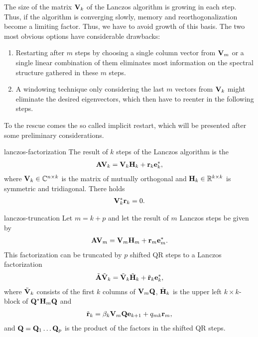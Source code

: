 \begin{intro}
  The size of the matrix $\mathbf V_k$ of the Lanczos algorithm is growing
  in each step. Thus, if the algorithm is converging slowly, memory
  and reorthogonalization become a limiting factor. Thus, we have to
  avoid growth of this basis. The two most obvious options have
  considerable drawbacks:
  \begin{enumerate}
  \item Restarting after $m$ steps by choosing a single column vector
    from $\mathbf V_m$ or a single linear combination of them eliminates
    most information on the spectral structure gathered in these $m$
    steps.
  \item A windowing technique only considering the last $m$ vectors
    from $\mathbf V_k$ might eliminate the desired eigenvectors, which
    then have to reenter in the following steps.
  \end{enumerate}
  To the rescue comes the so called implicit restart, which will be
  presented after some preliminary considerations.
\end{intro}

\begin{Definition}{lanczos-factorization}
  The result of $k$ steps of the Lanczos algorithm is the
  \begin{gather}
    \mathbf A\mathbf V_k = \mathbf V_k\mathbf H_k + \mathbf r_k\mathbf e_k^*,
  \end{gather}
  where $\mathbf V_k\in\mathbb C^{n\times k}$ is the matrix of mutually
  orthogonal  and $\mathbf H_k\in\mathbb R^{k\times k}$
  is symmetric and tridiagonal. There holds
  \begin{gather}
    \mathbf V_k^*\mathbf r_k = 0.
  \end{gather}
\end{Definition}

\begin{Lemma}{lanczos-truncation}
  Let $m=k+p$ and let the result of $m$ Lanczos steps be given by
  \begin{gather}
    \mathbf A\mathbf V_m = \mathbf V_m\mathbf H_m + \mathbf r_m\mathbf e_m^*.
  \end{gather}
  This factorization can be truncated by $p$ shifted QR steps to a
  Lanczos factorization
    \begin{gather}
    \tilde{\mathbf A}\tilde{\mathbf V}_k = \tilde{\mathbf V}_k\tilde{\mathbf H}_k + \tilde{\mathbf r}_k\mathbf e_k^*,
  \end{gather}
  where $\tilde{\mathbf V}_k$ consists of the first $k$ columns of $\mathbf V_m\mathbf Q$, $\tilde{\mathbf H}_k$ is the upper left $k\times k$-block of $\mathbf Q^*\mathbf H_m\mathbf Q$ and
  \begin{gather}
    \tilde{\mathbf r}_k = \beta_k\mathbf V_m\mathbf Q \mathbf e_{k+1} + q_{mk} \mathbf r_m ,
  \end{gather}
  and $\mathbf Q=\mathbf Q_1\dots\mathbf Q_p$ is the product of the factors in the
  shifted QR steps.
\end{Lemma}

